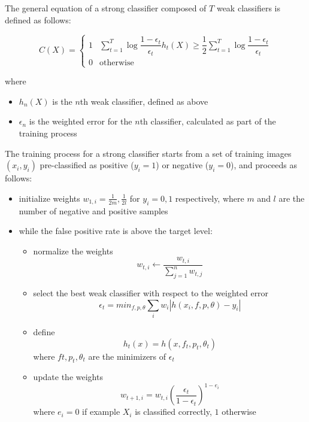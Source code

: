 \documentclass[a4paper,11pt,titlepage]{article}
\begin{document}
The general equation of a strong classifier composed of $T$ weak classifiers is
defined as follows:

\[
  C(X) =
  \begin{cases}
    1& \sum_{t=1}^{T} \log \dfrac{1-\epsilon_{t}}{\epsilon_{t}} h_{t}(X) \geq
    \dfrac{1}{2} \sum_{t=1}^{T} \log \dfrac{1-\epsilon_{t}}{\epsilon_{t}} \\
    0& \text{otherwise}
  \end{cases}
\]

where

\begin{itemize}
  \item $h_{n}(X)$ is the $n$th weak classifier, defined as above
  \item $\epsilon_{n}$ is the weighted error for the $n$th classifier,
    calculated as part of the training process
\end{itemize}

The training process for a strong classifier starts from a set of training
images $(x_{i}, y_{i})$ pre-classified as positive ($y_{i} = 1$) or negative
($y_{i} = 0$), and proceeds as follows:

\begin{itemize}
  \item initialize weights $w_{1,i} = \frac{1}{2m}, \frac{1}{2l}$ for $y_{i} =
    0,1$ respectively, where $m$ and $l$ are the number of negative and positive
    samples
  \item while the false positive rate is above the target level:
    \begin{itemize}
      \item normalize the weights 
        \[
          w_{t,i} \leftarrow \dfrac{w_{t,i}}{\sum_{j=1}^{n} w_{t,j}}
        \]
      \item select the best weak classifier with respect to the weighted error
        \[
          \epsilon_{t} = min_{f,p,\theta} \sum_{i} w_{i} \left|h(x_{i},f, p,
          \theta) - y_{i}\right|
        \]
      \item define
        \[
          h_{t}(x) = h(x, f_{t}, p_{t}, \theta_{t})
        \]
        where $f{t}, p_{t}, \theta_{t}$ are the minimizers of $\epsilon_{t}$
      \item update the weights
        \[
          w_{t+1,i} = w_{t,i}\left(\dfrac{\epsilon_{t}}{1-\epsilon_{t}}\right)^{1-e_{i}}
        \]
        where $e_{i} = 0$ if example $X_{i}$ is classified correctly, $1$
        otherwise
    \end{itemize}
\end{itemize}
\end{document}

